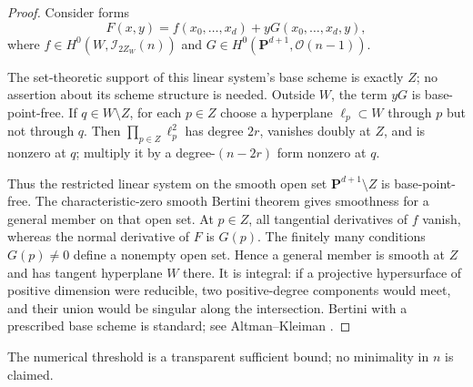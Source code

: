 \documentclass[11pt]{article}
\newcommand{\PP}{\mathbf P}
\newcommand{\cI}{\mathcal I}
\newcommand{\cO}{\mathcal O}
\begin{document}
\begin{proof}
Consider forms
\begin{equation}\label{eq:F-family}
 F(x,y)=f(x_0,\ldots,x_d)+yG(x_0,\ldots,x_d,y),
\end{equation}
where $f\in H^0(W,\cI_{2Z_W}(n))$ and
$G\in H^0(\PP^{d+1},\cO(n-1))$.

The set-theoretic support of this linear system's base scheme is exactly
$Z$; no assertion about its scheme structure is needed.  Outside $W$, the
term $yG$ is base-point-free.  If $q\in W\setminus Z$, for each $p\in Z$ choose a
hyperplane $\ell_p\subset W$ through $p$ but not through $q$.  Then
$\prod_{p\in Z}\ell_p^2$ has degree $2r$, vanishes doubly at $Z$, and is
nonzero at $q$; multiply it by a degree-$(n-2r)$ form nonzero at $q$.

Thus the restricted linear system on the smooth open set
$\PP^{d+1}\setminus Z$ is base-point-free.  The characteristic-zero smooth
Bertini theorem gives smoothness for a general member on that open set.  At
$p\in Z$, all tangential derivatives of $f$ vanish, whereas the normal
derivative of $F$ is $G(p)$.  The finitely many conditions $G(p)\neq0$ define
a nonempty open set.  Hence a general member is smooth at $Z$ and has tangent
hyperplane $W$ there.  It is integral: if a projective hypersurface of
positive dimension were reducible, two positive-degree components would
meet, and their union would be singular along the intersection.  Bertini
with a prescribed base scheme is
standard; see Altman--Kleiman \cite{AltmanKleiman1979}.
\end{proof}

The numerical threshold is a transparent sufficient bound; no minimality in
$n$ is claimed.
\end{document}
